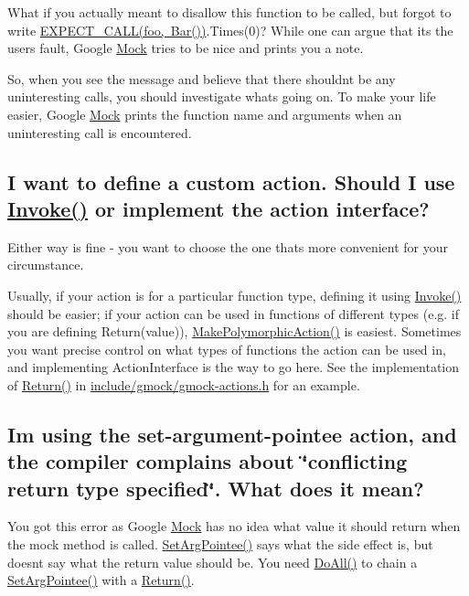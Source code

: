 What if you actually meant to disallow this function to be called, but forgot to write {\ttfamily \mbox{\hyperlink{gmock-spec-builders_8h_a535a6156de72c1a2e25a127e38ee5232}{E\+X\+P\+E\+C\+T\+\_\+\+C\+A\+L\+L(foo, Bar())}}.Times(0)}? While one can argue that it\textquotesingle{}s the user\textquotesingle{}s fault, Google \mbox{\hyperlink{classMock}{Mock}} tries to be nice and prints you a note.

So, when you see the message and believe that there shouldn\textquotesingle{}t be any uninteresting calls, you should investigate what\textquotesingle{}s going on. To make your life easier, Google \mbox{\hyperlink{classMock}{Mock}} prints the function name and arguments when an uninteresting call is encountered.

\subsection*{I want to define a custom action. Should I use \mbox{\hyperlink{namespacetesting_a12aebaf8363d49a383047529f798b694}{Invoke()}} or implement the action interface?}

Either way is fine -\/ you want to choose the one that\textquotesingle{}s more convenient for your circumstance.

Usually, if your action is for a particular function type, defining it using {\ttfamily \mbox{\hyperlink{namespacetesting_a12aebaf8363d49a383047529f798b694}{Invoke()}}} should be easier; if your action can be used in functions of different types (e.\+g. if you are defining {\ttfamily Return(value)}), {\ttfamily \mbox{\hyperlink{namespacetesting_a36bd06c5ea972c6df0bd9f40a7a94c65}{Make\+Polymorphic\+Action()}}} is easiest. Sometimes you want precise control on what types of functions the action can be used in, and implementing {\ttfamily Action\+Interface} is the way to go here. See the implementation of {\ttfamily \mbox{\hyperlink{namespacetesting_af6d1c13e9376c77671e37545cd84359c}{Return()}}} in {\ttfamily \mbox{\hyperlink{gmock-actions_8h}{include/gmock/gmock-\/actions.\+h}}} for an example.

\subsection*{I\textquotesingle{}m using the set-\/argument-\/pointee action, and the compiler complains about \char`\"{}conflicting return type specified\char`\"{}. What does it mean?}

You got this error as Google \mbox{\hyperlink{classMock}{Mock}} has no idea what value it should return when the mock method is called. {\ttfamily \mbox{\hyperlink{namespacetesting_a5740a5033b88c37666fcd09a269d123f}{Set\+Arg\+Pointee()}}} says what the side effect is, but doesn\textquotesingle{}t say what the return value should be. You need {\ttfamily \mbox{\hyperlink{namespacetesting_a5f533932753d2af95000e96c4a3042e3}{Do\+All()}}} to chain a {\ttfamily \mbox{\hyperlink{namespacetesting_a5740a5033b88c37666fcd09a269d123f}{Set\+Arg\+Pointee()}}} with a {\ttfamily \mbox{\hyperlink{namespacetesting_af6d1c13e9376c77671e37545cd84359c}{Return()}}}.

